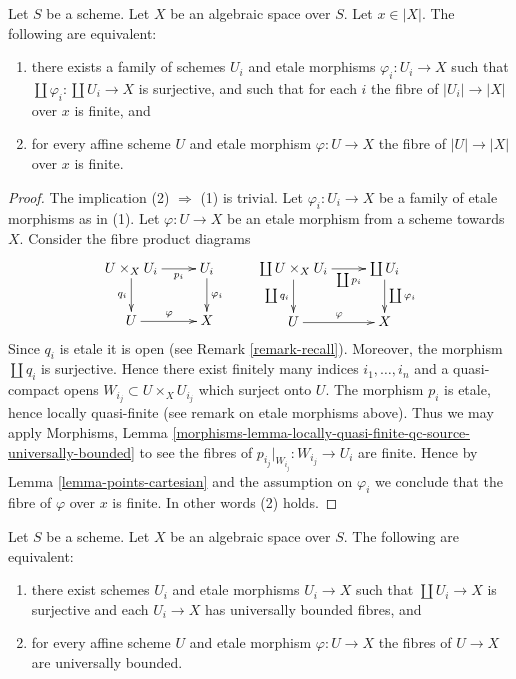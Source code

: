 \begin{lemma}
\label{lemma-U-finite-above-x}
Let $S$ be a scheme. Let $X$ be an algebraic space over $S$.
Let $x \in |X|$. The following are equivalent:
\begin{enumerate}
\item there exists a family of schemes $U_i$ and
etale morphisms $\varphi_i : U_i \to X$ such that
$\coprod \varphi_i : \coprod U_i \to X$ is surjective,
and such that for each $i$ the fibre of
$|U_i| \to |X|$ over $x$ is finite, and
\item for every affine scheme $U$ and etale morphism $\varphi : U \to X$
the fibre of $|U| \to |X|$ over $x$ is finite.
\end{enumerate}
\end{lemma}

\begin{proof}
The implication (2) $\Rightarrow$ (1) is trivial.
Let $\varphi_i : U_i \to X$ be a family of etale morphisms as in (1).
Let $\varphi : U \to X$ be an etale morphism from a scheme
towards $X$. Consider the fibre product diagrams
$$
\xymatrix{
U \times_X U_i \ar[r]_-{p_i} \ar[d]_{q_i} & U_i \ar[d]^{\varphi_i} \\
U \ar[r]^\varphi & X
}
\quad \quad
\xymatrix{
\coprod U \times_X U_i \ar[r]_-{\coprod p_i} \ar[d]_{\coprod q_i} &
\coprod U_i \ar[d]^{\coprod \varphi_i} \\
U \ar[r]^\varphi & X
}
$$
Since $q_i$ is etale it is open (see Remark \ref{remark-recall}).
Moreover, the morphism $\coprod q_i$ is surjective.
Hence there exist finitely many indices $i_1, \ldots, i_n$ and
a quasi-compact opens $W_{i_j} \subset U \times_X U_{i_j}$
which surject onto $U$.
The morphism $p_i$ is etale, hence locally quasi-finite (see remark on
etale morphisms above). Thus we may apply
Morphisms, Lemma
\ref{morphisms-lemma-locally-quasi-finite-qc-source-universally-bounded}
to see the fibres of $p_{i_j}|_{W_{i_j}} : W_{i_j} \to U_i$ are finite.
Hence by
Lemma \ref{lemma-points-cartesian}
and the assumption on $\varphi_i$ we conclude that the fibre 
of $\varphi$ over $x$ is finite. In other words (2) holds.
\end{proof}

\begin{lemma}
\label{lemma-U-universally-bounded}
Let $S$ be a scheme. Let $X$ be an algebraic space over $S$.
The following are equivalent:
\begin{enumerate}
\item there exist schemes $U_i$ and etale morphisms
$U_i \to X$ such that $\coprod U_i \to X$ is surjective and
each $U_i \to X$ has universally bounded fibres, and
\item for every affine scheme $U$ and etale morphism $\varphi : U \to X$
the fibres of $U \to X$ are universally bounded.
\end{enumerate}
\end{lemma}

